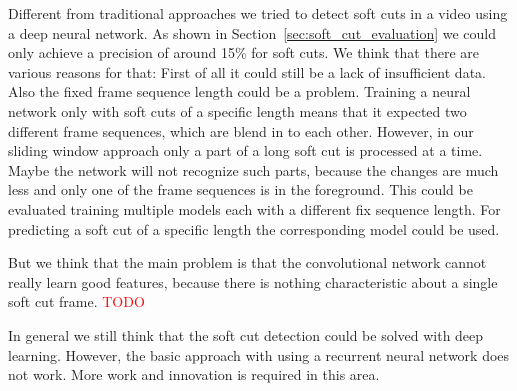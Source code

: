 Different from traditional approaches we tried to detect soft cuts in a video using a deep neural network.
As shown in Section~\ref{sec:soft_cut_evaluation} we could only achieve a precision of around 15\% for soft cuts.
We think that there are various reasons for that:
First of all it could still be a lack of insufficient data.
Also the fixed frame sequence length could be a problem.
Training a neural network only with soft cuts of a specific length means that it expected two different frame sequences, which are blend in to each other.
However, in our sliding window approach only a part of a long soft cut is processed at a time.
Maybe the network will not recognize such parts, because the changes are much less and only one of the frame sequences is in the foreground.
This could be evaluated training multiple models each with a different fix sequence length.
For predicting a soft cut of a specific length the corresponding model could be used.

But we think that the main problem is that the convolutional network cannot really learn good features, because there is nothing characteristic about a single soft cut frame.
\textcolor{red}{TODO}

In general we still think that the soft cut detection could be solved with deep learning.
However, the basic approach with using a recurrent neural network does not work.
More work and innovation is required in this area.